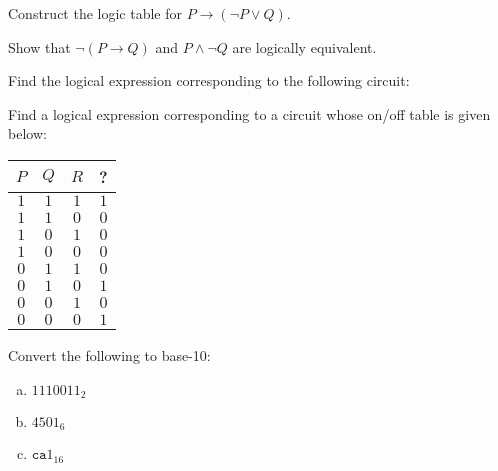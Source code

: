 \documentclass[12pt,letterpaper]{exam}
\begin{document}
\examtitle
{} 
\scores
\bottomline
\newpage

\begin{questions}

\newpage
\question[10] Construct the logic table for $P \to (\neg P \vee Q)$. 



\newpage
\question[10] Show that $\neg (P \to Q)$ and $P \wedge \neg Q$ are logically equivalent. 



\newpage
\question[10] Find the logical expression corresponding to the following circuit:



\newpage
\question[10] Find a logical expression corresponding to a circuit whose on/off table is given below: \par
	\begin{table}[h]
	\centering
	\begin{tabular}{c|c|c|c}
	$P$ & $Q$ & $R$ & ? \\ \hline
	$1$ & $1$ & $1$ & $1$ \\
	$1$ & $1$ & $0$ & $0$ \\
	$1$ & $0$ & $1$ & $0$ \\
	$1$ & $0$ & $0$ & $0$ \\
	$0$ & $1$ & $1$ & $0$ \\
	$0$ & $1$ & $0$ & $1$ \\
	$0$ & $0$ & $1$ & $0$ \\
	$0$ & $0$ & $0$ & $1$
	\end{tabular}
	\end{table}



\newpage
\question[10] Convert the following to base-10:
	\begin{enumerate}[(a)]
	\item $1110011_2$
	\item $4501_6$
	\item $\texttt{ca}1_{16}$
	\end{enumerate}




\end{questions}
\end{document}
